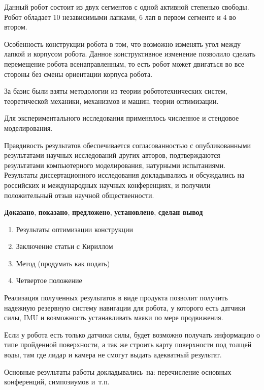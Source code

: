 Данный робот состоит из двух сегментов с одной активной степенью свободы. Робот обладает 10 независимыми лапками, 6 лап в первом сегменте и 4 во втором.

Особенность конструкции робота в том, что возможно изменять угол между лапкой и корпусом робота. Данное конструктивное изменение позволило сделать перемещение робота всенаправленным, то есть робот может двигаться во все стороны без смены ориентации корпуса робота.


{\methods} За базис были взяты методологии из теории робототехнических систем, теоретической механики, механизмов и машин, теории оптимизации.

Для экспериментального исследования применялось численное и стендовое моделирования.

{\reliability} Правдивость результатов обеспечивается согласованностью с опубликованными результатами научных исследований других авторов, подтверждаются результатами компьютерного моделирования, натурными испытаниями. Результаты диссертационного исследования докладывались и обсуждались на российских и международных научных конференциях, и получили положительный отзыв научной общественности.


{\novelty}
\textbf{Доказано}, \textbf{показано}, \textbf{предложено}, \textbf{установлено}, \textbf{сделан вывод}


{}
\begin{enumerate}[beginpenalty=10000] %
  \item Результаты оптимизации конструкции
  \item Заключение статьи с Кириллом
  \item Метод (продумать как подать)
  \item Четвертое положение
\end{enumerate}


{\influence} Реализация полученных результатов в виде продукта позволит получить надежную резервную систему навигации для робота, у которого есть датчики силы, IMU и возможность устанавливать маяки по мере продвижения.

Если у робота есть только датчики силы, будет возможно получать информацию о типе пройденной поверхности, а так же строить карту поверхности под толщей воды, там где лидар и камера не смогут выдать адекватный результат.


{\probation}
Основные результаты работы докладывались~на:
перечисление основных конференций, симпозиумов и~т.\:п.

